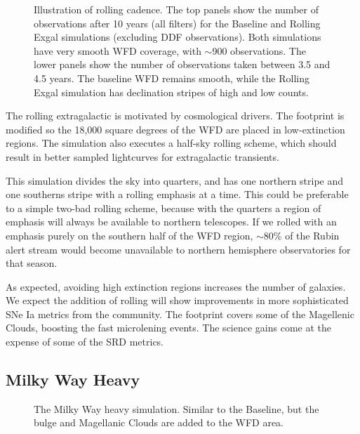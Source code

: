 \begin{figure}
\caption{Illustration of rolling cadence. The top panels show the number of observations after 10 years (all filters) for the Baseline and Rolling Exgal simulations (excluding DDF observations). Both simulations have very smooth WFD coverage, with $\sim$900 observations.  The lower panels show the number of observations taken between 3.5 and 4.5 years.  The baseline WFD remains smooth, while the Rolling Exgal simulation has declination stripes of high and low counts.}\label{fig:exgalroll}
\end{figure}


The rolling extragalactic is motivated by cosmological drivers. The footprint is modified so the 18,000 square degrees of the WFD are placed in low-extinction regions. The simulation also executes a half-sky rolling scheme, which should result in better sampled lightcurves for extragalactic transients.

This simulation divides the sky into quarters, and has one northern stripe and one southerns stripe with a rolling emphasis at a time. This could be preferable to a simple two-bad rolling scheme, because with the quarters a region of emphasis will always be available to northern telescopes. If we rolled with an emphasis purely on the southern half of the WFD region, $\sim$80\% of the Rubin alert stream would become unavailable to northern hemisphere observatories for that season.

As expected, avoiding high extinction regions increases the number of galaxies. We expect the addition of rolling will show improvements in more sophisticated SNe Ia metrics from the community. The footprint covers some of the Magellenic Clouds, boosting the fast microlening events. 
The science gains come at the expense of some of the SRD metrics. 

\subsection{Milky Way Heavy}
\begin{figure}
\caption{The Milky Way heavy simulation. Similar to the Baseline, but the bulge and Magellanic Clouds are added to the WFD area. }\label{fig:mwheavy}
\end{figure}

